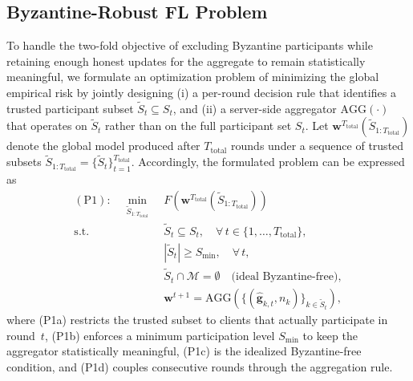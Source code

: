 \documentclass[journal]{IEEEtran}
\begin{document}
\subsection{Byzantine-Robust FL Problem}
\label{sec:p1}

To handle the two-fold objective of excluding Byzantine participants while retaining enough honest updates for the aggregate to remain statistically meaningful, we formulate an optimization problem of minimizing the global empirical risk by jointly designing (i) a per-round decision rule that identifies a trusted participant subset $\widetilde{S}_t \subseteq S_t$, and (ii) a server-side aggregator $\text{AGG}(\cdot)$ that operates on $\widetilde{S}_t$ rather than on the full participant set $S_t$. Let $\mathbf{w}^{T_{\text{total}}}(\widetilde{S}_{1:T_{\text{total}}})$ denote the global model produced after $T_{\text{total}}$ rounds under a sequence of trusted subsets $\widetilde{S}_{1:T_{\text{total}}}=\{\widetilde{S}_t\}_{t=1}^{T_{\text{total}}}$. Accordingly, the formulated problem can be expressed as
\begin{subequations}\label{eq:p1}
\begin{align}
(\mathrm{P1}):\quad\min_{\widetilde{S}_{1:T_{\text{total}}}}\;& F\!\left(\mathbf{w}^{T_{\text{total}}}(\widetilde{S}_{1:T_{\text{total}}})\right) \label{eq:p1_obj}\\
\text{s.t.}\quad &\widetilde{S}_t \subseteq S_t,\quad \forall\,t\in\{1,\dots,T_{\text{total}}\}, \tag{P1a}\\
&|\widetilde{S}_t| \ge S_{\min},\quad \forall\,t, \tag{P1b}\\
&\widetilde{S}_t \cap \mathcal{M} = \emptyset \quad \text{(ideal Byzantine-free)}, \tag{P1c}\\
&\mathbf{w}^{t+1}=\text{AGG}\!\left(\{(\hat{\mathbf{g}}_{k,t},n_k)\}_{k\in\widetilde{S}_t}\right),\tag{P1d}
\end{align}
\end{subequations}
where (P1a) restricts the trusted subset to clients that actually participate in round~$t$, (P1b) enforces a minimum participation level $S_{\min}$ to keep the aggregator statistically meaningful, (P1c) is the idealized Byzantine-free condition, and (P1d) couples consecutive rounds through the aggregation rule.
\end{document}
